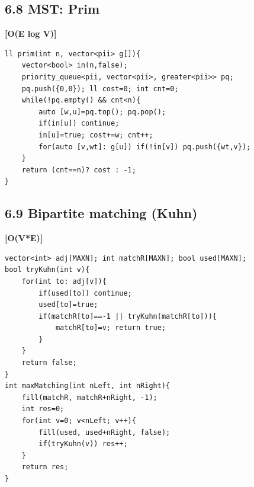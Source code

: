 \documentclass[11pt]{extarticle}
\newcommand{\comp}[1]{\textbf{[#1]}\\}
\begin{document}
\subsection*{6.8 MST: Prim}
\comp{O(E log V)}
\begin{lstlisting}
ll prim(int n, vector<pii> g[]){
    vector<bool> in(n,false);
    priority_queue<pii, vector<pii>, greater<pii>> pq;
    pq.push({0,0}); ll cost=0; int cnt=0;
    while(!pq.empty() && cnt<n){
        auto [w,u]=pq.top(); pq.pop();
        if(in[u]) continue;
        in[u]=true; cost+=w; cnt++;
        for(auto [v,wt]: g[u]) if(!in[v]) pq.push({wt,v});
    }
    return (cnt==n)? cost : -1;
}
\end{lstlisting}

\subsection*{6.9 Bipartite matching (Kuhn)}
\comp{O(V*E)}
\begin{lstlisting}
vector<int> adj[MAXN]; int matchR[MAXN]; bool used[MAXN];
bool tryKuhn(int v){
    for(int to: adj[v]){
        if(used[to]) continue;
        used[to]=true;
        if(matchR[to]==-1 || tryKuhn(matchR[to])){
            matchR[to]=v; return true;
        }
    }
    return false;
}
int maxMatching(int nLeft, int nRight){
    fill(matchR, matchR+nRight, -1);
    int res=0;
    for(int v=0; v<nLeft; v++){
        fill(used, used+nRight, false);
        if(tryKuhn(v)) res++;
    }
    return res;
}
\end{lstlisting}
\end{document}
